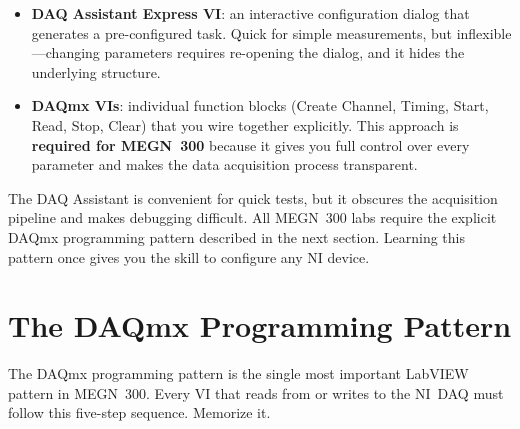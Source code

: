 \begin{itemize}[leftmargin=1.5em]
\item \textbf{DAQ Assistant Express VI}: an interactive configuration dialog that generates a pre-configured task. Quick for simple measurements, but inflexible---changing parameters requires re-opening the dialog, and it hides the underlying structure.
\item \textbf{DAQmx VIs}: individual function blocks (Create Channel, Timing, Start, Read, Stop, Clear) that you wire together explicitly. This approach is \textbf{required for MEGN~300} because it gives you full control over every parameter and makes the data acquisition process transparent.
\end{itemize}

\begin{tipbox}
The DAQ Assistant is convenient for quick tests, but it obscures the acquisition pipeline and makes debugging difficult. All MEGN~300 labs require the explicit DAQmx programming pattern described in the next section. Learning this pattern once gives you the skill to configure any NI device.
\end{tipbox}

\section{The DAQmx Programming Pattern}
\label{sec:lv_daqmx_pattern}

The DAQmx programming pattern is the single most important LabVIEW pattern in MEGN~300. Every VI that reads from or writes to the NI~DAQ must follow this five-step sequence. Memorize it.

